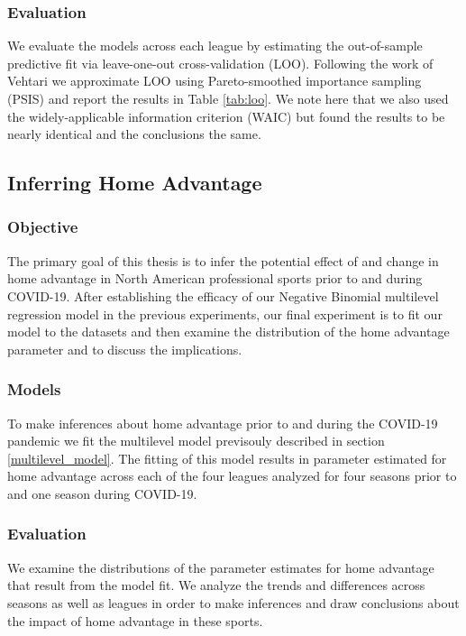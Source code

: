 \subsubsection*{Evaluation}

We evaluate the models across each league by estimating the out-of-sample predictive fit via leave-one-out cross-validation (LOO). Following the work of Vehtari \cite{Vehtari2016} we approximate LOO using Pareto-smoothed importance sampling (PSIS) and report the results in Table \ref{tab:loo}. We note here that we also used the widely-applicable information criterion (WAIC) \cite{Watanabe2010} but found the results to be nearly identical and the conclusions the same.

\subsection{Inferring Home Advantage}

\subsubsection*{Objective}

The primary goal of this thesis is to infer the potential effect of and change in home advantage in North American professional sports prior to and during COVID-19. After establishing the efficacy of our Negative Binomial multilevel regression model in the previous experiments, our final experiment is to fit our model to the datasets and then examine the distribution of the home advantage parameter and to discuss the implications.

\subsubsection*{Models}

To make inferences about home advantage prior to and during the COVID-19 pandemic we fit the multilevel model previsouly described in section \ref{multilevel_model}. The fitting of this model results in parameter estimated for home advantage across each of the four leagues analyzed for four seasons prior to and one season during COVID-19.

\subsubsection*{Evaluation}

We examine the distributions of the parameter estimates for home advantage that result from the model fit. We analyze the trends and differences across seasons as well as leagues in order to make inferences and draw conclusions about the impact of home advantage in these sports.